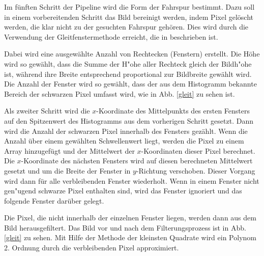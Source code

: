 \documentclass[arbeit=studie,oneside,BCOR=12mm]{ArbeitRST}
\begin{document}
Im fünften Schritt der Pipeline wird die Form der Fahrspur bestimmt. Dazu soll
in einem vorbereitenden Schritt das Bild bereinigt werden, indem Pixel gelöscht
werden, die klar nicht zu der gesuchten Fahrspur gehören. Dies wird durch die
Verwendung der Gleitfenstermethode erreicht, die in \cite{addison-pipeline}
beschrieben ist.

Dabei wird eine ausgewählte Anzahl von Rechtecken (Fenstern) erstellt. Die Höhe
wird so gewählt, dass die Summe der H"ohe aller Rechteck gleich der Bildh"ohe
ist, während ihre Breite entsprechend proportional zur Bildbreite gewählt wird.
Die Anzahl der Fenster wird so gewählt, dass der aus dem Histogramm bekannte
Bereich der schwarzen Pixel umfasst wird, wie in Abb. \ref{gleit} zu sehen ist. 

Als zweiter Schritt wird die $x$-Koordinate des Mittelpunkts des ersten Fensters auf den
Spitzenwert des Histogramms aus dem vorherigen Schritt gesetzt. Dann wird die
Anzahl der schwarzen Pixel innerhalb des Fensters gezählt. Wenn die Anzahl über
einem gewählten Schwellenwert liegt, werden die Pixel zu einem Array
hinzugefügt und der Mittelwert der $x$-Koordinaten dieser Pixel berechnet. Die
$x$-Koordinate des nächsten Fensters wird auf diesen berechneten Mittelwert
gesetzt und um die Breite der Fenster in $y$-Richtung verschoben. Dieser
Vorgang wird dann für alle verbleibenden Fenster wiederholt. Wenn in einem
Fenster nicht gen"ugend schwarze Pixel enthalten sind, wird das Fenster
ignoriert und das folgende Fenster darüber gelegt.  

Die Pixel, die nicht innerhalb der einzelnen Fenster liegen, werden dann aus
dem Bild herausgefiltert. Das Bild vor und nach dem Filterungsprozess ist in
Abb. \ref{gleit} zu sehen. Mit Hilfe der Methode der kleinsten Quadrate wird ein
Polynom 2. Ordnung durch die verbleibenden Pixel approximiert.
\end{document}
